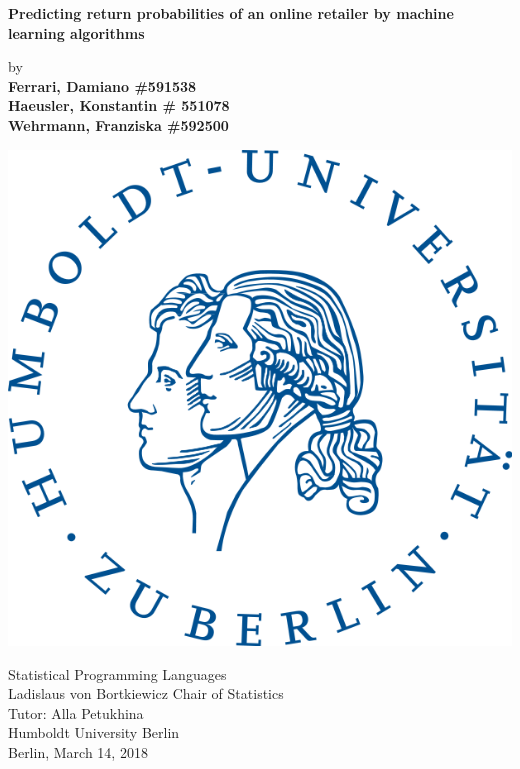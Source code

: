 \begin{center}

    {\Large{\bf Predicting return probabilities of an online retailer by machine learning algorithms}} \vspace{0.5cm}


    {\normalsize by \\\vspace{0.5cm}
    {\bf Ferrari, Damiano \#591538 \\
    Haeusler, Konstantin \# 551078 \\
    Wehrmann, Franziska \#592500} \\
    } \vspace{1cm}

	{	\includegraphics[scale=0.2]{pictures/logo_hu.png}}

	\vspace{1cm}	
	
    {\normalsize Statistical Programming Languages \\
    Ladislaus von Bortkiewicz Chair of Statistics \\
    Tutor: Alla Petukhina \\
    Humboldt University Berlin \\
    Berlin,  March 14, 2018}

\end{center}
